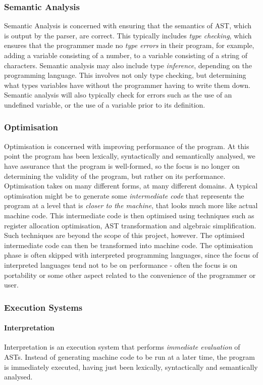 \documentclass{article}
\begin{document}
\subsubsection{Semantic Analysis}
Semantic Analysis is concerned with ensuring that the semantics of AST, which is output by the parser, are correct. This typically includes \emph{type checking}, which ensures that the programmer made no \emph{type errors} in their program, for example, adding a variable consisting of a number, to a variable consisting of a string of characters. Semantic analysis may also include type \emph{inference}, depending on the programming language. This involves not only type checking, but determining what types variables have without the programmer having to write them down. Semantic analysis will also typically check for errors such as the use of an undefined variable, or the use of a variable prior to its definition.

\subsubsection{Optimisation}
Optimisation is concerned with improving performance of the program. At this point the program has been lexically, syntactically and semantically analysed, we have assurance that the program is well-formed, so the focus is no longer on determining the validity of the program, but rather on its performance. Optimisation takes on many different forms, at many different domains. A typical optimisation might be to generate some \emph{intermediate code} that represents the program at a level that is \emph{closer to the machine}, that looks much more like actual machine code. This intermediate code is then optimised using techniques such as register allocation optimisation, AST transformation and algebraic simplification. Such techniques are beyond the scope of this project, however. The optimised intermediate code can then be transformed into machine code.
\indent The optimisation phase is often skipped with interpreted programming languages, since the focus of interpreted languages tend not to be on performance - often the focus is on portability or some other aspect related to the convenience of the programmer or user.

\subsubsection{Execution Systems}
\paragraph{Interpretation \\}
Interpretation is an execution system that performs \emph{immediate evaluation} of ASTs. Instead of generating machine code to be run at a later time, the program is immediately executed, having just been lexically, syntactically and semantically analysed.
\end{document}
